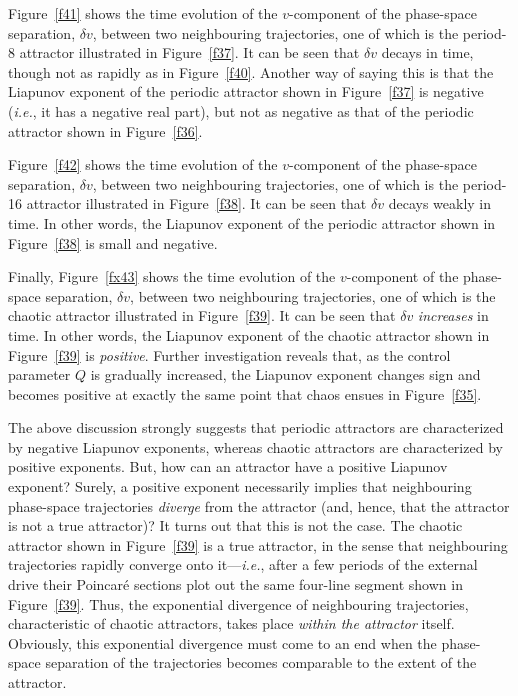Figure~\ref{f41} shows the time evolution of the $v$-component of the phase-space
separation, $\delta v$, between two neighbouring trajectories, one of which is the period-8
attractor illustrated in Figure~\ref{f37}. It can be seen that $\delta v$ decays in time,
though not as rapidly as in Figure~\ref{f40}. Another way of saying this is that the
Liapunov exponent of the periodic  attractor shown in Figure~\ref{f37} 
is negative ({\em i.e.}, it has a negative real part),
but not as negative as that of the periodic attractor shown in Figure~\ref{f36}.

Figure~\ref{f42} shows the time evolution of the $v$-component of the phase-space
separation, $\delta v$, between two neighbouring trajectories, one of which is the period-16
attractor illustrated in Figure~\ref{f38}. It can be seen that $\delta v$ decays weakly in
time. In other words, the Liapunov exponent of the periodic attractor shown in Figure~\ref{f38} is
small and negative. 

Finally, Figure~\ref{fx43} shows the time evolution of the $v$-component of the phase-space
separation, $\delta v$, between two neighbouring trajectories, one of which is the chaotic
attractor illustrated in Figure~\ref{f39}. It can be seen that $\delta v$ {\em increases}\/   in
time. In other words, the  Liapunov exponent of the chaotic attractor shown in Figure~\ref{f39} is
{\em positive}. Further investigation reveals that, as the control parameter $Q$
is gradually increased, the Liapunov exponent changes sign and becomes positive at exactly the same
point that chaos ensues in Figure~\ref{f35}. 

The above discussion strongly suggests that periodic attractors are characterized by negative
Liapunov exponents, whereas chaotic attractors are characterized by positive exponents.
But, how can an attractor have a positive Liapunov exponent? Surely, a positive
exponent necessarily implies that neighbouring phase-space trajectories {\em diverge}\/
from the attractor (and, hence, that the attractor is not a true attractor)? 
It turns out that this is not the case. The chaotic attractor
shown in Figure~\ref{f39} is a true attractor, in the sense that neighbouring trajectories
rapidly converge onto it---{\em i.e.}, after a few periods of the external drive
their Poincar\'{e} sections plot out the same four-line segment shown in Figure~\ref{f39}. 
Thus, the exponential divergence of neighbouring trajectories, characteristic of chaotic
attractors, takes place {\em within the attractor}\/ itself. Obviously, this exponential divergence
must come to an end when the phase-space separation of the trajectories becomes comparable to the 
extent of the attractor.

